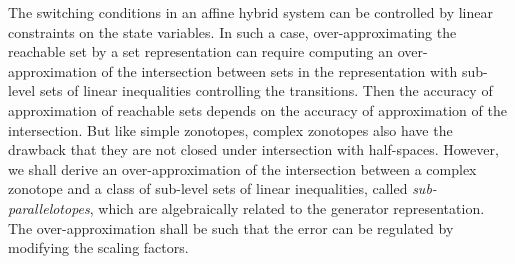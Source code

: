 The switching conditions in an affine hybrid system can be controlled
by linear constraints on the state variables.  In such a case,
over-approximating the reachable set by a set representation can
require computing an over-approximation of the intersection between
sets in the representation with sub-level sets of linear inequalities
controlling the transitions.  Then the accuracy of approximation of
reachable sets depends on the accuracy of approximation of the
intersection.  But like simple zonotopes, complex zonotopes also have
the drawback that they are not closed under intersection with
half-spaces.  However, we shall derive an over-approximation of the
intersection between a complex zonotope and a class of sub-level sets
of linear inequalities, called \emph{sub-parallelotopes}, which are
algebraically related to the generator representation.  The
over-approximation shall be such that the error can be regulated by
modifying the scaling factors.

